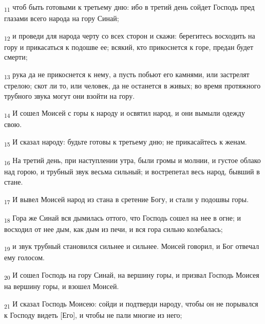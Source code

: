 \begin{tcolorbox}
\textsubscript{11} чтоб быть готовыми к третьему дню: ибо в третий день сойдет Господь пред глазами всего народа на гору Синай;
\end{tcolorbox}
\begin{tcolorbox}
\textsubscript{12} и проведи для народа черту со всех сторон и скажи: берегитесь восходить на гору и прикасаться к подошве ее; всякий, кто прикоснется к горе, предан будет смерти;
\end{tcolorbox}
\begin{tcolorbox}
\textsubscript{13} рука да не прикоснется к нему, а пусть побьют его камнями, или застрелят стрелою; скот ли то, или человек, да не останется в живых; во время протяжного трубного звука могут они взойти на гору.
\end{tcolorbox}
\begin{tcolorbox}
\textsubscript{14} И сошел Моисей с горы к народу и освятил народ, и они вымыли одежду свою.
\end{tcolorbox}
\begin{tcolorbox}
\textsubscript{15} И сказал народу: будьте готовы к третьему дню; не прикасайтесь к женам.
\end{tcolorbox}
\begin{tcolorbox}
\textsubscript{16} На третий день, при наступлении утра, были громы и молнии, и густое облако над горою, и трубный звук весьма сильный; и вострепетал весь народ, бывший в стане.
\end{tcolorbox}
\begin{tcolorbox}
\textsubscript{17} И вывел Моисей народ из стана в сретение Богу, и стали у подошвы горы.
\end{tcolorbox}
\begin{tcolorbox}
\textsubscript{18} Гора же Синай вся дымилась оттого, что Господь сошел на нее в огне; и восходил от нее дым, как дым из печи, и вся гора сильно колебалась;
\end{tcolorbox}
\begin{tcolorbox}
\textsubscript{19} и звук трубный становился сильнее и сильнее. Моисей говорил, и Бог отвечал ему голосом.
\end{tcolorbox}
\begin{tcolorbox}
\textsubscript{20} И сошел Господь на гору Синай, на вершину горы, и призвал Господь Моисея на вершину горы, и взошел Моисей.
\end{tcolorbox}
\begin{tcolorbox}
\textsubscript{21} И сказал Господь Моисею: сойди и подтверди народу, чтобы он не порывался к Господу видеть [Его], и чтобы не пали многие из него;
\end{tcolorbox}
